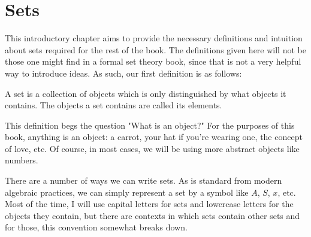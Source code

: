 \section{Sets}
This introductory chapter aims to provide the necessary definitions and intuition about sets required for the rest of the book. The definitions given here will not be those one might find in a formal set theory book, since that is not a very helpful way to introduce ideas. As such, our first definition is as follows:
\begin{definition}
    A set is a collection of objects which is only distinguished by what objects it contains. The objects a set contains are called its elements.
\end{definition}
\noindent
This definition begs the question "What is an object?" For the purposes of this book, anything is an object: a carrot, your hat if you're wearing one, the concept of love, etc. Of course, in most cases, we will be using more abstract objects like numbers.

There are a number of ways we can write sets. As is standard from modern algebraic practices, we can simply represent a set by a symbol like $A$, $S$, $x$, etc.
Most of the time, I will use capital letters for sets and lowercase letters for the objects they contain, but there are contexts in which sets contain other sets and for those, this convention somewhat breaks down.

